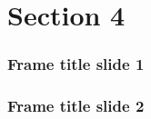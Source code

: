 
\section{Section 4}

\begin{frame}
	\frametitle{Frame title slide 1}
        
 
\end{frame}


\begin{frame}
	\frametitle{Frame title slide 2}
        
 
\end{frame}


